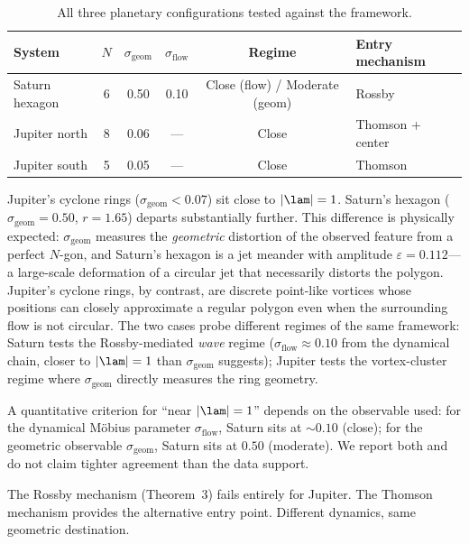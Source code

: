 \begin{table}[htbp]
\centering
\caption{All three planetary configurations tested against the framework.}
\label{tab:cross-planet}
\begin{tabular}{lccccl}
\toprule
System & $N$ & $\sigma_{\mathrm{geom}}$ & $\sigma_{\mathrm{flow}}$ & Regime & Entry mechanism \\
\midrule
Saturn hexagon    & 6 & 0.50 & 0.10 & Close (flow) / Moderate (geom) & Rossby \\
Jupiter north     & 8 & 0.06 & --- & Close & Thomson + center \\
Jupiter south     & 5 & 0.05 & --- & Close & Thomson \\
\bottomrule
\end{tabular}
\end{table}

Jupiter's cyclone rings ($\sigma_{\mathrm{geom}} < 0.07$) sit close to
$|\lam| = 1$.  Saturn's hexagon ($\sigma_{\mathrm{geom}} = 0.50$,
$r = 1.65$) departs substantially further.  This difference is physically
expected: $\sigma_{\mathrm{geom}}$ measures the \emph{geometric}
distortion of the observed feature from a perfect $N$-gon, and Saturn's
hexagon is a jet meander with amplitude $\varepsilon = 0.112$---a
large-scale deformation of a circular jet that necessarily distorts the
polygon.  Jupiter's cyclone rings, by contrast, are discrete point-like
vortices whose positions can closely approximate a regular polygon even
when the surrounding flow is not circular.  The two cases probe different
regimes of the same framework: Saturn tests the Rossby-mediated
\emph{wave} regime ($\sigma_{\mathrm{flow}} \approx 0.10$ from the
dynamical chain, closer to $|\lam| = 1$ than $\sigma_{\mathrm{geom}}$
suggests); Jupiter tests the vortex-cluster regime where
$\sigma_{\mathrm{geom}}$ directly measures the ring geometry.

A quantitative criterion for ``near $|\lam| = 1$'' depends on the
observable used: for the dynamical M\"obius parameter
$\sigma_{\mathrm{flow}}$, Saturn sits at $\sim 0.10$ (close); for the
geometric observable $\sigma_{\mathrm{geom}}$, Saturn sits at $0.50$
(moderate).  We report both and do not claim tighter agreement than the
data support.

The Rossby mechanism (Theorem~3) fails entirely for Jupiter.  The Thomson
mechanism provides the alternative entry point.  Different dynamics,
same geometric destination.

